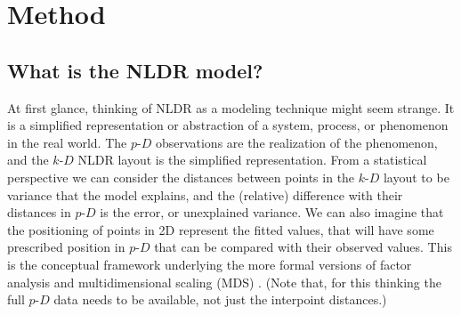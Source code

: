 \documentclass[
  12pt]{article}
\newcommand\pD{$p\text{-}D$}
\newcommand\kD{$k\text{-}D$}
\begin{document}
\section{Method}\label{sec-method}

\subsection{What is the NLDR model?}\label{what-is-the-nldr-model}

At first glance, thinking of NLDR as a modeling technique might seem
strange. It is a simplified representation or abstraction of a system,
process, or phenomenon in the real world. The \pD{} observations are the
realization of the phenomenon, and the \kD{} NLDR layout is the
simplified representation. From a statistical perspective we can
consider the distances between points in the \kD{} layout to be variance
that the model explains, and the (relative) difference with their
distances in \pD{} is the error, or unexplained variance. We can also
imagine that the positioning of points in 2D represent the fitted
values, that will have some prescribed position in \pD{} that can be
compared with their observed values. This is the conceptual framework
underlying the more formal versions of factor analysis \citep{cfa69} and
multidimensional scaling (MDS) \citep{borg2005}. (Note that, for this
thinking the full \pD{} data needs to be available, not just the
interpoint distances.)
\end{document}
